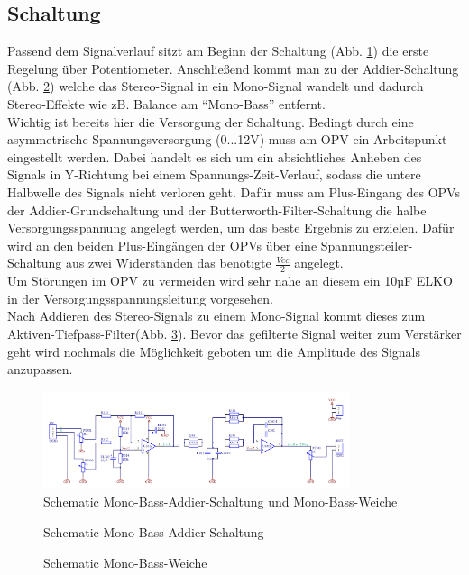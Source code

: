 \subsection{Schaltung}\label{subsec:5.1.3}
Passend dem Signalverlauf sitzt am Beginn der Schaltung (Abb. \ref{fig:5.1.3.1}) die erste Regelung über Potentiometer. Anschließend kommt man zu der Addier-Schaltung (Abb. \ref{fig:5.1.3.2}) welche das Stereo-Signal in ein Mono-Signal wandelt und dadurch Stereo-Effekte wie zB. Balance am \enquote{Mono-Bass} entfernt.\\
Wichtig ist bereits hier die Versorgung der Schaltung. Bedingt durch eine asymmetrische Spannungsversorgung (0...12V) muss am OPV ein Arbeitspunkt eingestellt werden. Dabei handelt es sich um ein absichtliches Anheben des Signals in Y-Richtung bei einem Spannungs-Zeit-Verlauf, sodass die untere Halbwelle des Signals nicht verloren geht. Dafür muss am Plus-Eingang des OPVs der Addier-Grundschaltung und der Butterworth-Filter-Schaltung die halbe Versorgungsspannung angelegt werden, um das beste Ergebnis zu erzielen. Dafür wird an den beiden Plus-Eingängen der OPVs über eine Spannungsteiler-Schaltung aus zwei Widerständen das benötigte $\frac{Vcc}{2}$ angelegt.\\
Um Störungen im OPV zu vermeiden wird sehr nahe an diesem ein 10µF ELKO in der Versorgungsspannungsleitung vorgesehen.\\
Nach Addieren des Stereo-Signals zu einem Mono-Signal kommt dieses zum Aktiven-Tiefpass-Filter(Abb. \ref{fig:5.1.3.3}). Bevor das gefilterte Signal weiter zum Verstärker geht wird nochmals die Möglichkeit geboten um die Amplitude des Signals anzupassen.
\begin{figure} [H]
	\centering
	\includegraphics[width=0.8\textwidth]{img/Print3/3mTTWeicheruAddiererDiplSchematic.PNG}
	\caption{Schematic Mono-Bass-Addier-Schaltung und Mono-Bass-Weiche}
	\label {fig:5.1.3.1}
\end{figure}
\begin{figure} [H]
	\centering
	\caption{Schematic Mono-Bass-Addier-Schaltung}
	\label {fig:5.1.3.2}
\end{figure}
\begin{figure} [H]
	\centering
	\caption{Schematic Mono-Bass-Weiche}
	\label {fig:5.1.3.3}
\end{figure}

